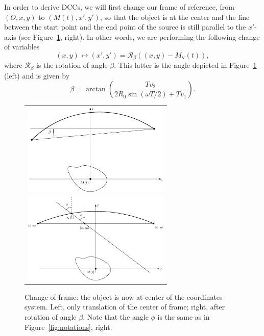 \documentclass[9pt,technote]{IEEEtran}
\numberwithin{equation}{section}
\newcommand{\Mbv}{M_{\mathbf{v}}}
\begin{document}
In order to derive DCCs, we will first change our frame of reference, from $\left(O, x, y\right)$ to $\left(M(t), x', y'\right)$, so that the object is at the center and the line between the start point and the end point of the source is still parallel to the $x'$-axis (see Figure~\ref{fig:change_frame}, right). In other words, we are performing the following change of variables
\begin{equation}
	(x,y) \leftrightarrow (x',y') = \mathcal{R}_{\beta} \left( (x,y)-\Mbv(t) \right),
\end{equation}
where $\mathcal{R}_{\beta}$ is the rotation of angle $\beta$. This latter is the angle depicted in Figure~\ref{fig:change_frame} (left) and is given by
\begin{equation}
	\beta = \arctan \left( \frac{T v_2}{2R_0 \sin(\omega T/2) + T v_1} \right).
\end{equation}

\begin{figure}[!ht]
	\centering
	\begin{tabular}{c}
	\includegraphics[width=7cm]{figs/frame_object_before_rotation.eps} \\
	\includegraphics[width=7cm]{figs/frame_object.eps}
	\end{tabular}
	\caption{Change of frame: the object is now at center of the coordinates system. Left, only translation of the center of frame; right, after rotation of angle $\beta$. Note that the angle $\phi$ is the same as in Figure~\ref{fig:notations}, right.\label{fig:change_frame}}
\end{figure}
\end{document}
